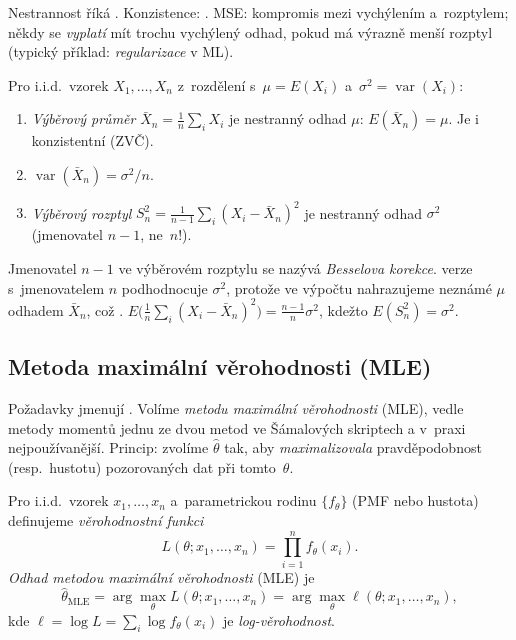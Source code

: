 \documentclass[11pt,a4paper]{article}
\DeclareMathOperator{\Var}{var}
\begin{document}
\begin{intuice}
Nestrannost říká . Konzistence: . MSE: kompromis mezi vychýlením a~rozptylem; někdy se \emph{vyplatí} mít trochu vychýlený odhad, pokud má výrazně menší rozptyl (typický příklad: \emph{regularizace} v ML).
\end{intuice}

\begin{veta}
Pro i.i.d.\ vzorek $X_1,\dots,X_n$ z~rozdělení s~$\mu=E(X_i)$ a~$\sigma^2=\Var(X_i)$:
\begin{enumerate}[label=(\arabic*)]
  \item \emph{Výběrový průměr} $\bar X_n=\tfrac1n\sum_i X_i$ je nestranný odhad $\mu$: $E(\bar X_n)=\mu$. Je i konzistentní (ZVČ).
  \item $\Var(\bar X_n)=\sigma^2/n$.
  \item \emph{Výběrový rozptyl} $S_n^2=\tfrac{1}{n-1}\sum_i(X_i-\bar X_n)^2$ je nestranný odhad $\sigma^2$ (jmenovatel $n-1$, ne~$n$!).
\end{enumerate}
\end{veta}

\begin{poznamka}
Jmenovatel $n-1$ ve výběrovém rozptylu se nazývá \emph{Besselova korekce}.  verze s~jmenovatelem $n$ podhodnocuje $\sigma^2$, protože ve výpočtu nahrazujeme neznámé $\mu$ odhadem $\bar X_n$, což . $E\bigl(\tfrac1n\sum_i(X_i-\bar X_n)^2\bigr)=\tfrac{n-1}{n}\sigma^2$, kdežto $E(S_n^2)=\sigma^2$.
\end{poznamka}

\subsection{Metoda maximální věrohodnosti (MLE)}

Požadavky jmenují . Volíme \emph{metodu maximální věrohodnosti} (MLE), vedle metody momentů jednu ze dvou metod ve Šámalových skriptech a v~praxi nejpoužívanější. Princip: zvolíme $\hat\theta$ tak, aby \emph{maximalizovala} pravděpodobnost (resp.\ hustotu) pozorovaných dat při tomto~$\theta$.

\begin{definice}
Pro i.i.d.\ vzorek $x_1,\dots,x_n$ a~parametrickou rodinu $\{f_\theta\}$ (PMF nebo hustota) definujeme \emph{věrohodnostní funkci}
\[
L(\theta;x_1,\dots,x_n)=\prod_{i=1}^n f_\theta(x_i).
\]
\emph{Odhad metodou maximální věrohodnosti} (MLE) je
\[
\hat\theta_{\mathrm{MLE}}=\arg\max_{\theta} L(\theta;x_1,\dots,x_n)=\arg\max_{\theta} \ell(\theta;x_1,\dots,x_n),
\]
kde $\ell=\log L=\sum_i\log f_\theta(x_i)$ je \emph{log-věrohodnost}.
\end{definice}
\end{document}
